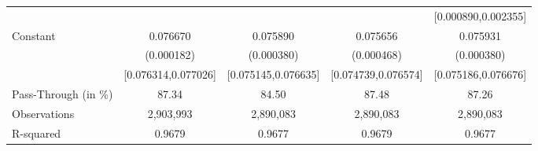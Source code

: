 {\begin{tabular}{l*{4}{c}}
                    &                     &                     &                     &[0.000890,0.002355]         \\
Constant            &    0.076670\sym{***}&    0.075890\sym{***}&    0.075656\sym{***}&    0.075931\sym{***}\\
                    &  (0.000182)         &  (0.000380)         &  (0.000468)         &  (0.000380)         \\
                    &[0.076314,0.077026]         &[0.075145,0.076635]         &[0.074739,0.076574]         &[0.075186,0.076676]         \\
\midrule
Pass-Through (in \%)&       87.34         &       84.50         &       87.48         &       87.26         \\
Observations        &   2,903,993         &   2,890,083         &   2,890,083         &   2,890,083         \\
R-squared           &      0.9679         &      0.9677         &      0.9679         &      0.9677         \\
\bottomrule
\end{tabular}
}

